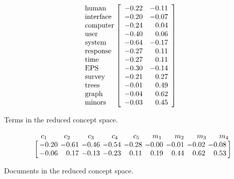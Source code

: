 \begin{equation} \label{eq:LSI_newterms}
\begin{tabular}{ccc}
	&	\hspace{-9.0mm}  $\begin{array}{l} \text{human} \\ \text{interface}  \\ \text{computer} \\ \text{user} \\ \text{system} \\ \text{response}  \\ \text{time} \\ \text{EPS} \\ \text{survey} \\ \text{trees} \\ \text{graph} \\ \text{minors} \end{array}$	&\hspace{-5mm}$\left[ \begin{array}{rr}  - 0.22&- 0.11\\ - 0.20&- 0.07\\ - 0.24& 0.04\\ - 0.40&0.06\\ - 0.64&- 0.17\\ - 0.27&0.11\\ - 0.27& 0.11\\ - 0.30&-0.14\\ - 0.21& 0.27\\ - 0.01&0.49\\ - 0.04& 0.62\\ - 0.03&0.45\end{array}   \right]$
\end{tabular}
\end{equation}
\begin{center} Terms in the reduced concept space. \end{center}

\begin{equation} \label{eq:LSI_newdocs}
\begin{tabular}{cc}
	&	$\hspace{-2.0mm}  \arraycolsep=9.0pt  \begin{array}{ccccccccc}c_1& \hspace{2mm} c_2& \ \  c_3& \ \  c_4& \ c_5&m_1&m_2&m_3&m_4 \end{array}$ \\
	&\hspace{-5mm} $ \left[  \arraycolsep=2pt \begin{array}{rrrrrrrrr} - 0.20&- 0.61&- 0.46&- 0.54&- 0.28&- 0.00&- 0.01&- 0.02&- 0.08\\ - 0.06& 0.17&- 0.13&- 0.23& 0.11& 0.19& 0.44& 0.62& 0.53 \end{array} \right]$
\end{tabular}
\end{equation}
\begin{center} Documents in the reduced concept space. \end{center}

